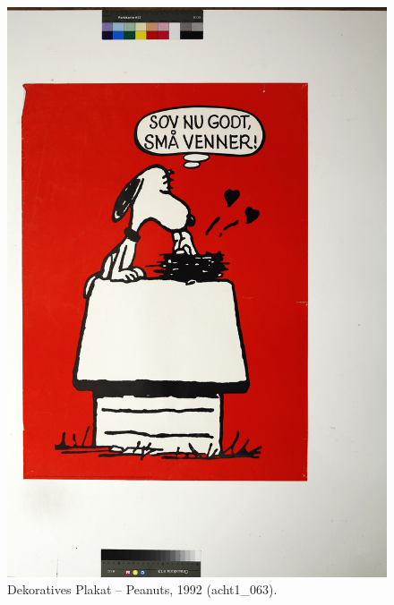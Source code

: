 \documentclass[a4paper,12pt,ngerman]{article}
\begin{document}
\newpage
\begin{figure}[ht]
\includegraphics[width=\linewidth]{Abbildung_22_(acht1_063)}
\centering
\caption{Dekoratives Plakat – Peanuts, 1992 (acht1\_063).}
\end{figure}
\end{document}
